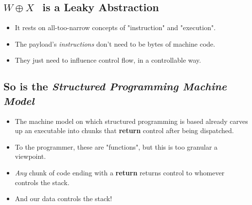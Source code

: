 \documentclass[11pt]{article}
\begin{document}
\subsection*{\(W\oplus X~~\) is a Leaky Abstraction}
\label{sec:orgc6d633d}
\begin{itemize}
\item It rests on all-too-narrow concepts of "instruction" and "execution".
\item The payload's \emph{instructions} don't need to be bytes of machine code.
\item They just need to influence control flow, in a controllable way.
\end{itemize}
\subsection*{So is the \emph{Structured Programming Machine Model}}
\label{sec:orgc3052a8}
\begin{itemize}
\item The machine model on which structured programming is based already carves up an executable into chunks that \textbf{return} control after being dispatched.
\item To the programmer, these are "functions", but this is too granular a viewpoint.
\item \emph{Any} chunk of code ending with a \textbf{return} returns control to whomever controls the stack.
\item And our data controls the stack!
\end{itemize}
\end{document}
